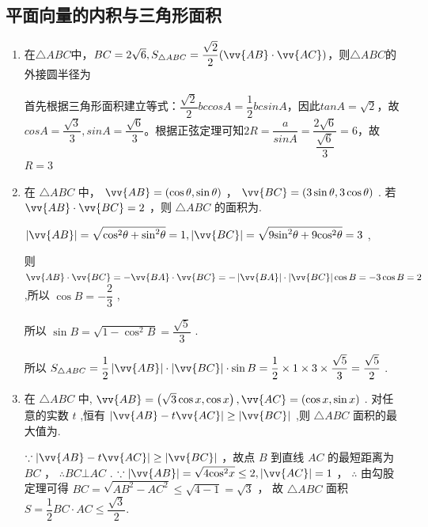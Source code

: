 \subsection*{平面向量的内积与三角形面积}
\begin{enumerate}
    \item 在$\triangle ABC$中，$BC = 2\sqrt{6}, S_{\triangle ABC} = \dfrac{\sqrt{2}}{2}(\vv{AB} \cdot \vv{AC})$，则$\triangle ABC$的外接圆半径为
    \begin{jieda}
        首先根据三角形面积建立等式：$\dfrac{\sqrt{2}}{2}bc cosA = \dfrac{1}{2}bc sinA$，因此$tanA = \sqrt{2}$，故$cosA = \dfrac{\sqrt{3}}{3}, sinA = \dfrac{\sqrt{6}}{3}$。根据正弦定理可知$2R = \dfrac{a}{sinA} = \dfrac{2\sqrt{6}}{\dfrac{\sqrt{6}}{3}} = 6$，故$R = 3$
    \end{jieda}

    \item 在 $\bigtriangleup  {ABC}$ 中， $\vv{AB} = \left( {\cos \theta ,\sin \theta }\right)$ ， $\vv{BC} = \left( {3\sin \theta ,3\cos \theta }\right)$ . 若 $\vv{AB} \cdot  \vv{BC} = 2$ ，则 $\bigtriangleup  {ABC}$ 的面积为.
    \begin{jieda}
        $\left| \vv{AB}\right|  = \sqrt{{\cos }^{2}\theta  + {\sin }^{2}\theta } = 1,\left| \vv{BC}\right|  = \sqrt{9{\sin }^{2}\theta  + 9{\cos }^{2}\theta } = 3$ ,
        
        则 $\vv{AB} \cdot  \vv{BC} =  - \vv{BA} \cdot  \vv{BC} =  - \left| \vv{BA}\right|  \cdot  \left| \vv{BC}\right| \cos B =  - 3\cos B = 2$ ,所以 $\cos B =  - \dfrac{2}{3}$ ,
        
        所以 $\sin B = \sqrt{1 - {\cos }^{2}B} = \dfrac{\sqrt{5}}{3}$ .
        
        所以 ${S}_{\bigtriangleup {ABC}} = \dfrac{1}{2}\left| \vv{AB}\right|  \cdot  \left| \vv{BC}\right|  \cdot  \sin B = \dfrac{1}{2} \times  1 \times  3 \times  \dfrac{\sqrt{5}}{3} = \dfrac{\sqrt{5}}{2}$ .
    \end{jieda}
    \item 在 $\bigtriangleup  {ABC}$ 中, $\vv{AB} = \left( {\sqrt{3}\cos x,\cos x}\right) ,\vv{AC} = \left( {\cos x,\sin x}\right)$ . 对任意的实数 $t$ ,恒有 $\left| {\vv{AB} - t\vv{AC}}\right|  \geq  \left| \vv{BC}\right|$ ,则 $\bigtriangleup {ABC}$ 面积的最大值为.
    \begin{jieda}
        $\because \left| {\vv{AB} - t\vv{AC}}\right|  \geq  \left| \vv{BC}\right|$ ，故点 $B$ 到直线 ${AC}$ 的最短距离为 ${BC}$ ， $\therefore {BC}\bot {AC}$ . $\because \left| \vv{AB}\right|  = \sqrt{4{\cos }^{2}x} \leq  2,\left| \vv{AC}\right|  = 1$ ， $\therefore$ 由勾股定理可得 ${BC} = \sqrt{A{B}^2 - A{C}^2} \leq  \sqrt{4 - 1} = \sqrt{3}$ ， 故 $\bigtriangleup {ABC}$ 面积 $S = \dfrac{1}{2}{BC} \cdot  {AC} \leq  \dfrac{\sqrt{3}}{2}$.
    \end{jieda}
\end{enumerate}

